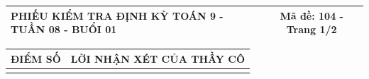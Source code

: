 \documentclass[12pt,a4paper]{article}
\begin{document}
\newpage

\noindent
\begin{tabularx}{\linewidth}{|X|c|}
\hline
\textbf{PHIẾU KIỂM TRA ĐỊNH KỲ TOÁN 9 - TUẦN 08 - BUỔI 01} & \textbf{Mã đề: 104 - Trang 1/2} \\
\hline
\end{tabularx}

\vspace{1.0mm}

\noindent
\begin{tabularx}{\linewidth}{|p{3.2cm}|X|}
\hline
\centering\textbf{ĐIỂM SỐ} & \centering\textbf{LỜI NHẬN XÉT CỦA THẦY CÔ} \tabularnewline
\hline
\rule{0pt}{1.8cm} & \tabularnewline
\hline
\end{tabularx}
\end{document}
